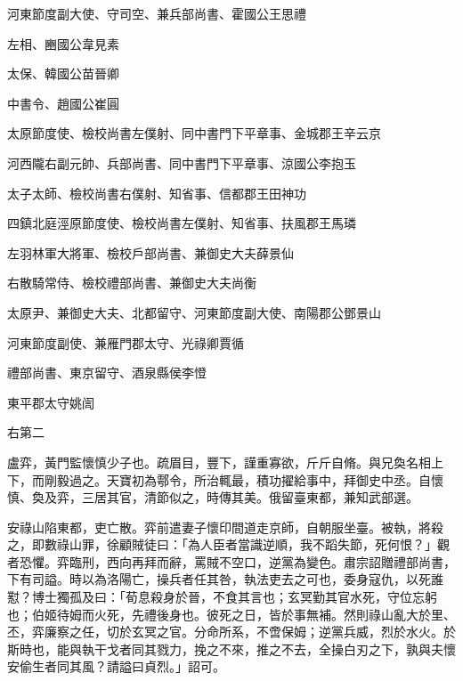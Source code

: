 \begin{pinyinscope}
 河東節度副大使、守司空、兼兵部尚書、霍國公王思禮



 左相、豳國公韋見素



 太保、韓國公苗晉卿



 中書令、趙國公崔圓



 太原節度使、檢校尚書左僕射、同中書門下平章事、金城郡王辛云京



 河西隴右副元帥、兵部尚書、同中書門下平章事、涼國公李抱玉



 太子太師、檢校尚書右僕射、知省事、信都郡王田神功



 四鎮北庭涇原節度使、檢校尚書左僕射、知省事、扶風郡王馬璘



 左羽林軍大將軍、檢校戶部尚書、兼御史大夫薛景仙



 右散騎常侍、檢校禮部尚書、兼御史大夫尚衡



 太原尹、兼御史大夫、北都留守、河東節度副大使、南陽郡公鄧景山



 河東節度副使、兼雁門郡太守、光祿卿賈循



 禮部尚書、東京留守、酒泉縣侯李憕



 東平郡太守姚訚



 右第二



 盧弈，黃門監懷慎少子也。疏眉目，豐下，謹重寡欲，斤斤自脩。與兄奐名相上下，而剛毅過之。天寶初為鄠令，所治輒最，積功擢給事中，拜御史中丞。自懷慎、奐及弈，三居其官，清節似之，時傳其美。俄留臺東都，兼知武部選。



 安祿山陷東都，吏亡散。弈前遣妻子懷印間道走京師，自朝服坐臺。被執，將殺之，即數祿山罪，徐顧賊徒曰：「為人臣者當識逆順，我不蹈失節，死何恨？」觀者恐懼。弈臨刑，西向再拜而辭，罵賊不空口，逆黨為變色。肅宗詔贈禮部尚書，下有司謚。時以為洛陽亡，操兵者任其咎，執法吏去之可也，委身寇仇，以死誰懟？博士獨孤及曰：「荀息殺身於晉，不食其言也；玄冥勤其官水死，守位忘躬也；伯姬待姆而火死，先禮後身也。彼死之日，皆於事無補。然則祿山亂大於里、丕，弈廉察之任，切於玄冥之官。分命所系，不啻保姆；逆黨兵威，烈於水火。於斯時也，能與執干戈者同其戮力，挽之不來，推之不去，全操白刃之下，孰與夫懷安偷生者同其風？請謚曰貞烈。」詔可。




\end{pinyinscope}
